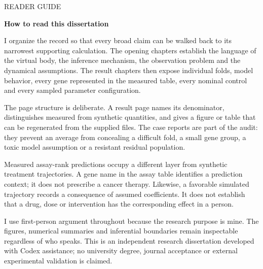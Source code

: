 \documentclass[10pt]{article}
\begin{document}
\clearpage
\hypertarget{p3}{}
{\small\color{accent}\MakeUppercase{Reader guide}}\par
{\LARGE\bfseries\color{ink}How to read this dissertation}\par\vspace{5pt}
I organize the record so that every broad claim can be walked back to its narrowest supporting calculation. The opening chapters establish the language of the virtual body, the inference mechanism, the observation problem and the dynamical assumptions. The result chapters then expose individual folds, model behavior, every gene represented in the measured table, every nominal control and every sampled parameter configuration.\par
The page structure is deliberate. A result page names its denominator, distinguishes measured from synthetic quantities, and gives a figure or table that can be regenerated from the supplied files. The case reports are part of the audit: they prevent an average from concealing a difficult fold, a small gene group, a toxic model assumption or a resistant residual population.\par
Measured assay-rank predictions occupy a different layer from synthetic treatment trajectories. A gene name in the assay table identifies a prediction context; it does not prescribe a cancer therapy. Likewise, a favorable simulated trajectory records a consequence of assumed coefficients. It does not establish that a drug, dose or intervention has the corresponding effect in a person.\par
I use first-person argument throughout because the research purpose is mine. The figures, numerical summaries and inferential boundaries remain inspectable regardless of who speaks. This is an independent research dissertation developed with Codex assistance; no university degree, journal acceptance or external experimental validation is claimed.\par
{}\par
\end{document}
